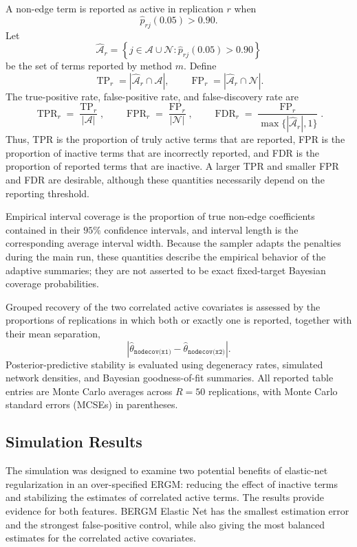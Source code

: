 \documentclass[preprint,12pt,authoryear]{elsarticle}
\begin{document}
A non-edge term is reported as active in replication \(r\) when
\[
\widehat p_{rj}(0.05)>0.90.
\]
Let
\[
\widehat{\mathcal A}_{r}
=
\left\{
j\in\mathcal A\cup\mathcal N:
\widehat p_{rj}(0.05)>0.90
\right\}
\]
be the set of terms reported by method \(m\). Define
\[
\operatorname{TP}_{r}
=
|\widehat{\mathcal A}_{r}\cap\mathcal A|,
\qquad
\operatorname{FP}_{r}
=
|\widehat{\mathcal A}_{r}\cap\mathcal N|.
\]
The true-positive rate, false-positive rate, and false-discovery rate are
\[
\operatorname{TPR}_{r}
=
\frac{\operatorname{TP}_{r}}{|\mathcal A|},
\qquad
\operatorname{FPR}_{r}
=
\frac{\operatorname{FP}_{r}}{|\mathcal N|},
\qquad
\operatorname{FDR}_{r}
=
\frac{\operatorname{FP}_{r}}
{\max\{|\widehat{\mathcal A}_{r}|,1\}}.
\]
Thus, TPR is the proportion of truly active terms that are reported, FPR is
the proportion of inactive terms that are incorrectly reported, and FDR is
the proportion of reported terms that are inactive. A larger TPR and smaller
FPR and FDR are desirable, although these quantities necessarily depend on
the reporting threshold.

Empirical interval coverage is the proportion of true non-edge coefficients
contained in their \(95\%\) confidence intervals, and interval
length is the corresponding average interval width. Because the sampler
adapts the penalties during the main run, these quantities describe the
empirical behavior of the adaptive summaries; they are not asserted to be
exact fixed-target Bayesian coverage probabilities.

Grouped recovery of the two correlated active covariates is assessed by the
proportions of replications in which both or exactly one is reported, together
with their mean separation,
\[
\left|
\widehat\theta_{\texttt{nodecov(x1)}}
-
\widehat\theta_{\texttt{nodecov(x2)}}
\right|.
\]
Posterior-predictive stability is evaluated using degeneracy rates, simulated
network densities, and Bayesian goodness-of-fit summaries. All reported table
entries are Monte Carlo averages across \(R=50\) replications, with Monte Carlo
standard errors (MCSEs) in parentheses.
\subsection{Simulation Results}

The simulation was designed to examine two potential benefits of elastic-net
regularization in an over-specified ERGM: reducing the effect of inactive terms
and stabilizing the estimates of correlated active terms. The results provide
evidence for both features. BERGM Elastic Net has the smallest estimation
error and the strongest false-positive control, while also giving the most
balanced estimates for the correlated active covariates.
\end{document}

